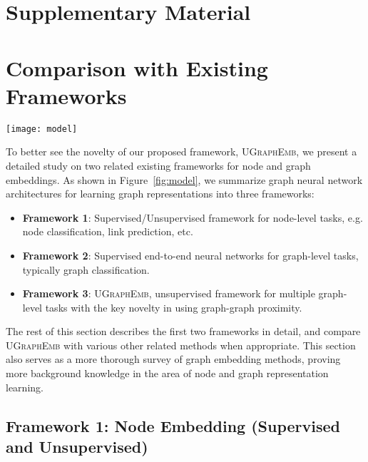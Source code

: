 \documentclass{article}
\newcommand{\model}{\textsc{UGraphEmb}\xspace}
\begin{document}
\clearpage
\small



\setcounter{section}{0} \clearpage
\newpage
\section*{{\Large Supplementary Material}}

\def\thesection{\Alph{section}}

\section{Comparison with Existing Frameworks}

\begin{figure*}
\centering
\texttt{[image: model]}
\caption{Architecture 1 and 2 are typical neural network architectures for graph representation learning. Architecture 3 is our proposed \model.}
\label{fig:model}
\vspace*{-2mm}
\end{figure*}

To better see the novelty of our proposed framework, \model, we present a detailed study on two related existing frameworks for node and graph embeddings. As shown in Figure~\ref{fig:model}, we summarize graph neural network architectures for learning graph representations into three frameworks:
\begin{itemize}
    \item \textbf{{Framework 1}}: Supervised/Unsupervised framework for node-level tasks, e.g. node classification, link prediction, etc.
    \item \textbf{{Framework 2}}: Supervised end-to-end neural networks for graph-level tasks, typically graph classification.
    \item \textbf{{Framework 3}}: \model, unsupervised framework for multiple graph-level tasks with the key novelty in using graph-graph proximity.
\end{itemize}

The rest of this section describes the first two frameworks in detail, and compare \model with various other related methods when appropriate. This section also serves as a more thorough survey of graph embedding methods, proving more background knowledge in the area of node and graph representation learning. 

\subsection{Framework 1: Node Embedding (Supervised and Unsupervised)}
\label{subsec-framework-1}
\end{document}
